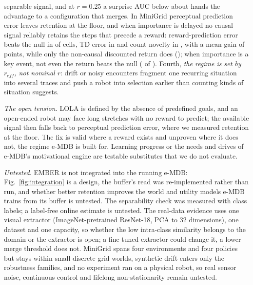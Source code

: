 \documentclass[conference]{IEEEtran}
\begin{document}
separable signal, and at $r=0.25$ a surprise AUC below about
hands the advantage to a configuration that merges. In MiniGrid perceptual prediction error leaves retention at the
floor, and when importance is delayed no causal signal reliably retains the
steps that precede a reward: reward-prediction error beats the null in
of 
cells, TD error in
and count novelty in
,
with a mean gain of
points, while only the non-causal discounted return does
();
when importance is a key event, not even the return beats the null
(
of ).
Fourth, \emph{the regime is set by $r_{eff}$, not nominal $r$}: drift or noisy
encounters fragment one recurring situation into several traces and push a
robot into selection earlier than counting kinds of situation suggests.

\emph{The open tension.} LOLA is defined by the absence of predefined goals,
and an open-ended robot may face long stretches with no reward to predict; the
available signal then falls back to perceptual prediction error, where we
measured retention at the floor. The fix is valid where a reward exists and
unproven where it does not, the regime e-MDB is built for. Learning progress or
the needs and drives of e-MDB's motivational engine \cite{becerra2021} are
testable substitutes that we do not evaluate.

\emph{Untested.} EMBER is not integrated into the running e-MDB:
Fig.~\ref{fig:integration} is a design, the buffer's read was re-implemented
rather than run, and whether better retention improves the world and utility
models e-MDB trains from its buffer is untested. The separability check was
measured with class labels; a label-free online estimate is untested. The
real-data evidence uses one visual extractor (ImageNet-pretrained ResNet-18,
PCA to 32 dimensions), one dataset and one capacity, so whether the low
intra-class similarity belongs to the domain or the extractor is open; a
fine-tuned extractor could change it, a lower merge threshold does not. MiniGrid
spans four environments and four policies but stays within small discrete grid
worlds, synthetic drift enters only the robustness families, and no experiment
ran on a physical robot, so real sensor noise, continuous control and lifelong
non-stationarity remain untested.
\end{document}
